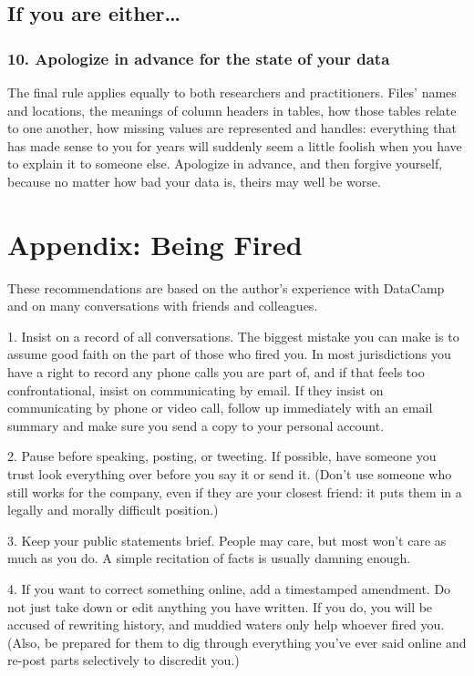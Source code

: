 \documentclass[10pt,letterpaper]{article}
\begin{document}
\subsection*{If you are either{\ldots}}

\subsubsection*{10. Apologize in advance for the state of your data}

The final rule applies equally to both researchers and practitioners. Files'
names and locations, the meanings of column headers in tables, how those tables
relate to one another, how missing values are represented and handles:
everything that has made sense to you for years will suddenly seem a little
foolish when you have to explain it to someone else. Apologize in advance, and
then forgive yourself, because no matter how bad your data is, theirs may well
be worse.

\section*{Appendix: Being Fired}

These recommendations are based on the author's experience with DataCamp \cite{Alba2019}
and on many conversations with friends and colleagues.

1. Insist on a record of all conversations.
   The biggest mistake you can make is to assume good faith on the part of those
   who fired you.  In most jurisdictions you have a right to record any phone calls
   you are part of, and if that feels too confrontational, insist on communicating
   by email.  If they insist on communicating by phone or video call, follow up
   immediately with an email summary and make sure you send a copy to your personal
   account.

2. Pause before speaking, posting, or tweeting.
   If possible, have someone you trust look everything over before you say it or
   send it.  (Don't use someone who still works for the company, even if they are
   your closest friend: it puts them in a legally and morally difficult position.)

3. Keep your public statements brief.
   People may care, but most won't care as much as you do.  A simple recitation of
   facts is usually damning enough.

4. If you want to correct something online, add a timestamped amendment.
   Do not just take down or edit anything you have written.  If you do, you will be
   accused of rewriting history, and muddied waters only help whoever fired you.
   (Also, be prepared for them to dig through everything you've ever said online
   and re-post parts selectively to discredit you.)
\end{document}
